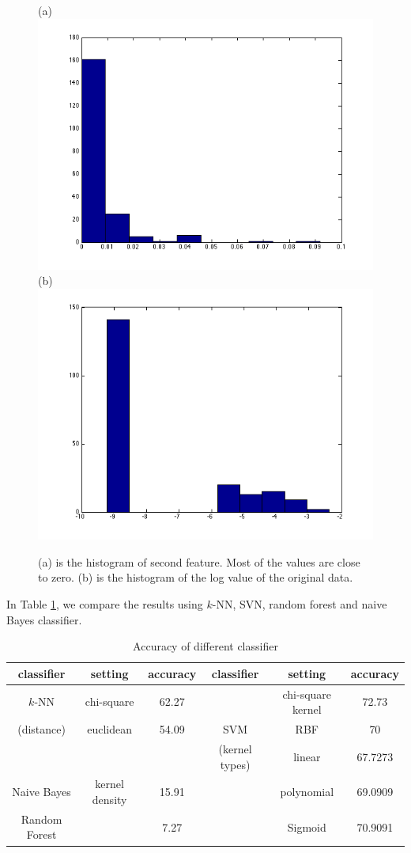 \documentclass{article} %
\begin{document}
\begin{figure}[b!]
    \centering
    {(a)\includegraphics[width=0.38\linewidth]{../Figure/Train_features}
    (b)\includegraphics[width=0.38\linewidth]{../Figure/Train_features_log}}
    \caption{(a) is the histogram of second feature. Most of the values are close to zero. (b) is the histogram of the log value of the original data.}
    \label{fig:hist}
\end{figure}


In Table \ref{tbl:classifers}, we compare the results using $k$-NN, SVN, random forest and naive Bayes classifier.


\begin{table}[t]
\caption{Accuracy of different classifier}
\begin{center}
\label{tbl:classifers}
\begin{tabular}{|c|c|c|c|c|c|}
\hline
   classifier  & setting      &accuracy   & classifier    & setting      & accuracy\\
\hline
$k$-NN     & chi-square    &62.27      &     &chi-square kernel  &72.73\\ \cline{2-3} \cline{5-6}
(distance) & euclidean     &54.09      &   SVM    & RBF               &70\\ \cline{1-3} \cline{5-6}
       &               &     &    (kernel types)    & linear            &67.7273\\ \cline{1-3} \cline{5-6}
Naive Bayes  & kernel density  & 15.91           &       & polynomial        &69.0909\\ \cline{1-3} \cline{5-6}
 Random Forest &         & 7.27                 &       & Sigmoid           &70.9091\\ \hline
\end{tabular}
\end{center}
\end{table}
\end{document}
